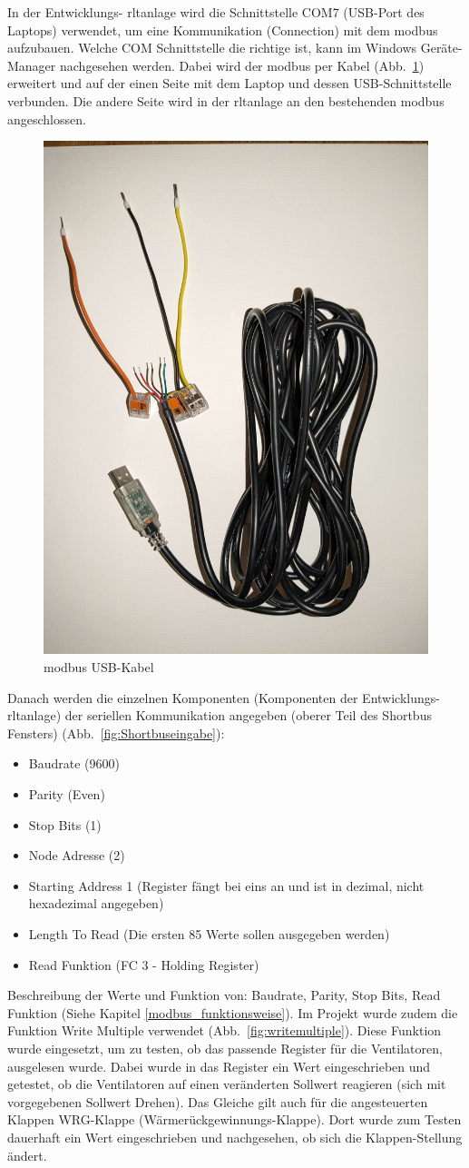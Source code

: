 In der Entwicklungs- \ac{rltanlage} wird die Schnittstelle COM7 (USB-Port des Laptops) verwendet, um eine Kommunikation (Connection) mit dem \gls{modbus} aufzubauen. Welche COM Schnittstelle die richtige ist, kann im Windows Geräte-Manager nachgesehen werden. Dabei wird der \gls{modbus} per Kabel  (Abb.~\ref{fig:modbus_usbkabel}) erweitert und auf der einen Seite mit dem Laptop und dessen USB-Schnittstelle verbunden. Die andere Seite wird in der \ac{rltanlage} an den bestehenden \gls{modbus} angeschlossen. 

\begin{figure}[H]
	\centering
	\includegraphics[width=0.3\linewidth]{Bilder/modbus_usbkabel}
	\caption{\gls{modbus} USB-Kabel} 
	\label{fig:modbus_usbkabel}
\end{figure}

Danach werden die einzelnen Komponenten (Komponenten der Entwicklungs- \ac{rltanlage}) der seriellen Kommunikation angegeben (oberer Teil des Shortbus Fensters) (Abb.~\ref{fig:Shortbuseingabe}):
\begin{itemize}
	\item Baudrate (9600)
	\item Parity (Even)
	\item Stop Bits (1)
	\item Node Adresse (2)
	\item Starting Address 1 (Register fängt bei eins an und ist in dezimal, nicht hexadezimal angegeben)
	\item Length To Read (Die ersten 85 Werte sollen ausgegeben werden)
	\item Read Funktion (FC 3 - Holding Register)
\end{itemize}

Beschreibung der Werte und Funktion von: Baudrate, Parity, Stop Bits, Read Funktion (Siehe Kapitel \ref{modbus_funktionsweise}).
Im Projekt wurde zudem die Funktion Write Multiple verwendet (Abb.~\ref{fig:writemultiple}). Diese Funktion wurde eingesetzt, um zu testen, ob das passende Register für \zB die Ventilatoren, ausgelesen wurde. Dabei wurde in das Register ein Wert eingeschrieben und getestet, ob die Ventilatoren auf einen veränderten Sollwert reagieren (sich mit vorgegebenen Sollwert Drehen). Das Gleiche gilt auch für die angesteuerten Klappen \zB WRG-Klappe (Wärmerückgewinnungs-Klappe). Dort wurde zum Testen dauerhaft ein Wert eingeschrieben und nachgesehen, ob sich die Klappen-Stellung ändert.

